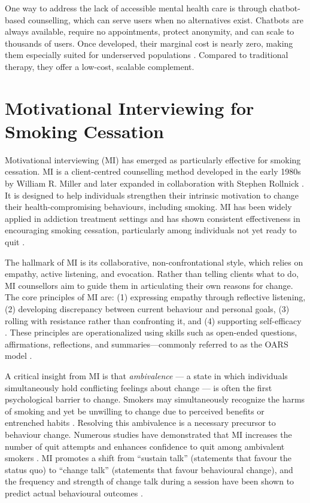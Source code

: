 One way to address the lack of accessible mental health care is through chatbot-based counselling, which can serve users when no alternatives exist. Chatbots are always available, require no appointments, protect anonymity, and can scale to thousands of users. Once developed, their marginal cost is nearly zero, making them especially suited for underserved populations \cite{torous2017digital,miner2016smartphone}. Compared to traditional therapy, they offer a low-cost, scalable complement.



\section{Motivational Interviewing for Smoking Cessation}

Motivational interviewing (MI) has emerged as particularly effective for smoking cessation. MI is a client-centred counselling method developed in the early 1980s by William R. Miller and later expanded in collaboration with Stephen Rollnick \cite{miller1991motivational,MillerRollnick2013}. It is designed to help individuals
strengthen their intrinsic motivation to change their health-compromising behaviours, including smoking. MI has been widely applied in addiction treatment settings and has shown consistent effectiveness in encouraging smoking cessation, particularly among individuals not yet ready to quit \cite{bischof2021evidence,hettema2005meta}.

The hallmark of MI is its collaborative, non-confrontational style, which relies on empathy, active listening, and evocation. Rather than telling clients what to do, MI counsellors aim to guide them in articulating their own reasons for change. The core principles of MI are: (1) expressing empathy through reflective listening, (2) developing discrepancy between current behaviour and personal goals, (3) rolling with resistance rather than confronting it, and (4) supporting self-efficacy \cite{rollnick2008motivational}. These principles are operationalized using skills such as open-ended questions, affirmations, reflections, and summaries---commonly referred to as the OARS model \cite{Miller_2023}.


A critical insight from MI is that \emph{ambivalence} --- a state in which individuals simultaneously hold conflicting feelings about change --- is often the first psychological barrier to change. Smokers may simultaneously recognize the harms of smoking and yet be unwilling to change due to perceived benefits or entrenched habits \cite{brown2023mi}. Resolving this ambivalence is a necessary precursor to behaviour change. Numerous studies have demonstrated that MI increases the number of quit attempts and enhances confidence to quit among ambivalent smokers \cite{Abar2013, Gwaltney2009-wj}. MI promotes a shift from ``sustain talk'' (statements that favour the status quo) to ``change talk'' (statements that favour behavioural change), and the frequency and strength of change talk during a session have been shown to predict actual behavioural outcomes \cite{apodaca2009mechanisms}.

